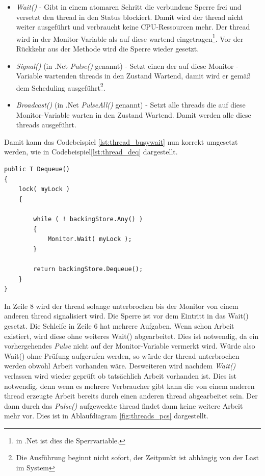 \begin{itemize}
	\item \textit{Wait()} - Gibt in einem atomaren Schritt die verbundene Sperre frei und versetzt den thread in den Status blockiert. Damit wird der thread nicht weiter ausgeführt und verbraucht keine CPU-Ressourcen mehr. Der thread wird in der Monitor-Variable als auf diese wartend eingetragen\footnote{in .Net ist dies die Sperrvariable.}. Vor der Rückkehr aus der Methode wird die Sperre wieder gesetzt.
	\item \textit{Signal()} (in .Net \textit{Pulse()} genannt) - Setzt einen der auf diese Monitor -Variable wartenden threads in den Zustand Wartend, damit wird er gemäß dem Scheduling ausgeführt\footnote{Die Ausführung beginnt nicht sofort, der Zeitpunkt ist abhängig von der Last im System}.
	\item \textit{Broadcast()} (in .Net \textit{PulseAll()} genannt) - Setzt alle threads die auf diese Monitor-Variable warten in den Zustand Wartend. Damit werden alle diese threads ausgeführt.
\end{itemize}
 Damit kann das Codebeispiel \ref{lst:thread_busywait} nun korrekt umgesetzt werden, wie in Codebeispiel\ref{lst:thread_deq} dargestellt.
\begin{lstlisting}[caption={Thread Monitor.Wait()},label={lst:thread_deq},captionpos=b]
public T Dequeue()
{
	lock( myLock )
	{

		while ( ! backingStore.Any() )
		{
			Monitor.Wait( myLock );
		}

		return backingStore.Dequeue();
	}
}
\end{lstlisting}
In Zeile 8 wird der thread solange unterbrochen bis der Monitor von einem anderen thread signalisiert wird. Die Sperre ist vor dem Eintritt in das Wait() gesetzt. Die Schleife in Zeile 6 hat mehrere Aufgaben. Wenn schon Arbeit existiert, wird diese ohne weiteres Wait() abgearbeitet. Dies ist notwendig, da ein vorhergehendes \textit{Pulse} nicht auf der Monitor-Variable vermerkt wird. Würde also Wait() ohne Prüfung aufgerufen werden, so würde der thread unterbrochen werden obwohl Arbeit vorhanden wäre. Desweiteren wird nachdem \textit{Wait()} verlassen wird wieder geprüft ob tatsächlich Arbeit vorhanden ist. Dies ist notwendig, denn wenn es mehrere Verbraucher gibt kann die von einem anderen thread erzeugte Arbeit bereits durch einen anderen thread abgearbeitet sein. Der dann durch das \textit{Pulse()} aufgeweckte thread findet dann keine weitere Arbeit mehr vor. Dies ist in Ablaufdiagram \ref{fig:threads_pcs} dargestellt.

